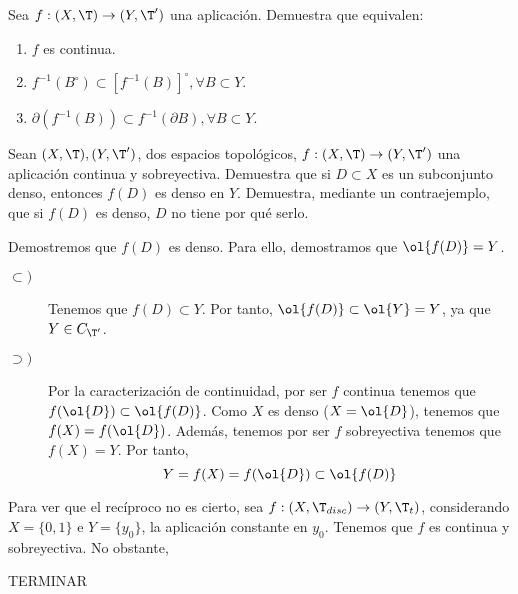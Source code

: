 \begin{ejercicio}
    Sea $f : (X, \T ) \to (Y, \T')$ una aplicación. Demuestra que equivalen:
\begin{enumerate}
    \item $f$ es continua.
    \item $f^{-1}(B^\circ) \subset [f^{-1}(B)]^\circ, \forall B \subset Y$.
    \item $\partial (f^{-1}(B)) \subset f^{-1}(\partial B), \forall B \subset Y$.
\end{enumerate}
\end{ejercicio}

\begin{ejercicio}
    Sean $(X, \T ), (Y, \T')$, dos espacios topológicos, $f : (X, \T ) \to (Y, \T')$ una aplicación continua y sobreyectiva. Demuestra que si $D \subset X$ es un subconjunto denso, entonces $f(D)$ es denso en $Y$. Demuestra, mediante un contraejemplo, que si $f(D)$ es denso, $D$ no tiene por qué serlo.

    Demostremos que $f(D)$ es denso. Para ello, demostramos que $\ol{f(D)}=Y$.
    \begin{description}
        \item[$\subset)$] Tenemos que $f(D)\subset Y$. Por tanto, $\ol{f(D)}\subset \ol{Y}=Y$, ya que $Y\in C_{\T'}$.

        \item[$\supset)$] Por la caracterización de continuidad, por ser $f$ continua tenemos que $f(\ol{D})\subset \ol{f(D)}$. Como $X$ es denso ($X=\ol{D}$), tenemos que $f(X)=f(\ol{D})$. Además, tenemos por ser $f$ sobreyectiva tenemos que $f(X)=Y$. Por tanto,
        \begin{equation*}
            Y=f(X)=f(\ol{D})\subset \ol{f(D)}
        \end{equation*}
    \end{description}


    Para ver que el recíproco no es cierto, sea $f:(X,\T_{disc})\to (Y, \T_t)$, considerando $X=\{0,1\}$ e $Y=\{y_0\}$, la aplicación constante en $y_0$. Tenemos que $f$ es continua y sobreyectiva. No obstante,

    TERMINAR
\end{ejercicio}

